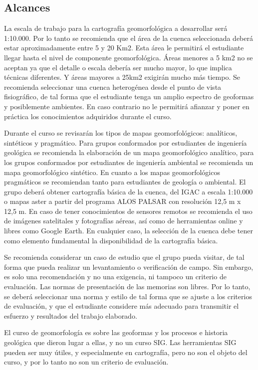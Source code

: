 \documentclass[twoside,11pt,]{article}
\begin{document}
\subsection{Alcances}
La escala de trabajo para la cartografía geomorfológica a desarrollar será 1:10.000. Por lo tanto se recomienda que el área de la cuenca seleccionada deberá estar aproximadamente entre 5 y 20 Km2. Esta área le permitirá el estudiante llegar hasta el nivel de componente geomorfológica. Áreas menores a 5 km2 no se aceptan ya que el detalle o escala debería ser mucho mayor, lo que implica técnicas diferentes. Y áreas mayores a 25km2 exigirán mucho más tiempo. Se recomienda seleccionar una cuenca heterogénea desde el punto de vista fisiográfico, de tal forma que el estudiante tenga un amplio espectro de geoformas y posiblemente ambientes. En caso contrario no le permitirá afianzar y poner en práctica los conocimientos adquiridos durante el curso.
\par Durante el curso se revisarán los tipos de mapas geomorfológicos: analíticos, sintéticos y pragmático. Para grupos conformados por estudiantes de ingeniería geológica se recomienda la elaboración de un mapa geomorfológico analítico, para los grupos conformados por estudiantes de ingeniería ambiental se recomienda un mapa geomorfológico sintético. En cuanto a los mapas geomorfológicos pragmáticos se recomiendan tanto para estudiantes de geología o ambiental.
El grupo deberá obtener cartografía básica de la cuenca, del IGAC a escala 1:10.000 o mapas aster a partir del programa ALOS PALSAR con resolución 12,5 m x 12,5 m. En caso de tener conocimientos de sensores remotos se recomienda el uso de imágenes satelitales y fotografías aéreas, así como de herramientas online y libres como Google Earth. En cualquier caso, la selección de la cuenca debe tener como elemento fundamental la disponibilidad de la cartografía básica.
\par Se recomienda considerar un caso de estudio que el grupo pueda visitar, de tal forma que pueda realizar un levantamiento o verificación de campo. Sin embargo, es solo una recomendación y no una exigencia, ni tampoco un criterio de evaluación.
Las normas de presentación de las memorias son libres. Por lo tanto, se deberá seleccionar una norma y estilo de tal forma que se ajuste a los criterios de evaluación, y que el estudiante considere más adecuado para transmitir el esfuerzo y resultados del trabajo elaborado.
\par El curso de geomorfología es sobre las geoformas y los procesos e historia geológica que dieron lugar a ellas, y no un curso SIG. Las herramientas SIG pueden ser muy útiles, y especialmente en cartografía, pero no son el objeto del curso, y por lo tanto no son un criterio de evaluación.
\end{document}
